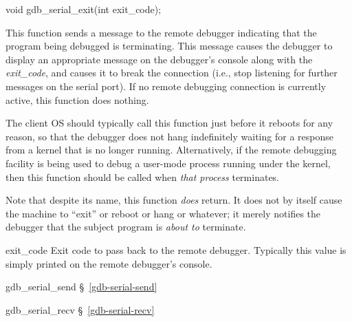 \label{gdb-serial-exit}
\begin{apisyn}

	\funcproto void gdb_serial_exit(int exit_code);
\end{apisyn}
\begin{apidesc}
	This function sends a message to the remote debugger
	indicating that the program being debugged is terminating.
	This message causes the debugger to display an appropriate message
	on the debugger's console along with the \emph{exit_code},
	and causes it to break the connection
	(i.e., stop listening for further messages on the serial port).
	If no remote debugging connection is currently active,
	this function does nothing.

	The client OS should typically call this function
	just before it reboots for any reason,
	so that the debugger does not hang indefinitely
	waiting for a response from a kernel that is no longer running.
	Alternatively,
	if the remote debugging facility is being used
	to debug a user-mode process running under the kernel,
	then this function should be called
	when \emph{that process} terminates.

	Note that despite its name, this function \emph{does} return.
	It does not by itself cause the machine
	to ``exit'' or reboot or hang or whatever;
	it merely notifies the debugger
	that the subject program is \emph{about to} terminate.
\end{apidesc}
\begin{apiparm}
	\item[exit_code]
		Exit code to pass back to the remote debugger.
		Typically this value is simply printed
		on the remote debugger's console.
\end{apiparm}
\begin{apidep}
	\item[gdb_serial_send]		\S~\ref{gdb-serial-send}
	\item[gdb_serial_recv]		\S~\ref{gdb-serial-recv}
\end{apidep}

